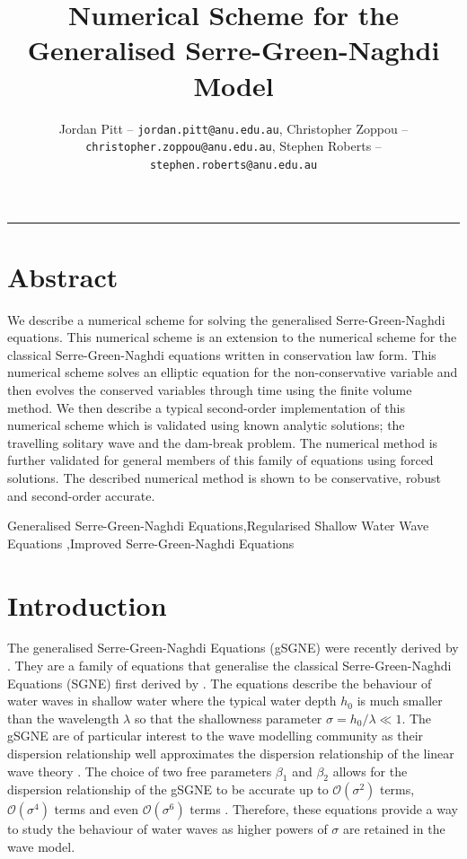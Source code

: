 \documentclass[10pt]{elsarticle}
\title{Numerical Scheme for the Generalised Serre-Green-Naghdi Model}
\author{Jordan Pitt -- \texttt{jordan.pitt@anu.edu.au}, Christopher Zoppou -- \texttt{christopher.zoppou@anu.edu.au}, Stephen Roberts -- \texttt{stephen.roberts@anu.edu.au}}
\begin{document}
\maketitle

\vspace{-0.3in}
\noindent
\rule{\linewidth}{0.4pt}



\section{Abstract}
We describe a numerical scheme for solving the generalised Serre-Green-Naghdi equations. This numerical scheme is an extension to the numerical scheme for the classical Serre-Green-Naghdi equations written in conservation law form. This numerical scheme solves an elliptic equation for the non-conservative variable and then evolves the conserved variables through time using the finite volume method. We then describe a typical second-order implementation of this numerical scheme which is validated using known analytic solutions; the travelling solitary wave and the dam-break problem. The numerical method is further validated for general members of this family of equations using forced solutions. The described numerical method is shown to be conservative, robust and second-order accurate.

\begin{keyword}
	Generalised Serre-Green-Naghdi Equations\sep Regularised Shallow Water Wave Equations \sep Improved Serre-Green-Naghdi Equations
\end{keyword}

\section{Introduction}
The generalised Serre-Green-Naghdi Equations (gSGNE) were recently derived by \citet{Clamond-Dutykh-2018-237}. They are a family of equations that generalise the classical Serre-Green-Naghdi Equations (SGNE) first derived by \citet{Serre-F-1953-857}. The equations describe the behaviour of water waves in shallow water where the typical water depth $h_0$ is much smaller than the wavelength $\lambda$ so that the shallowness parameter $\sigma = h_0/\lambda \ll 1$. The gSGNE are of particular interest to the wave modelling community as their dispersion relationship well approximates the dispersion relationship of the linear wave theory \cite{Whitham-1967-399}. The choice of two free parameters $\beta_1$ and $\beta_2$ allows for the dispersion relationship of the gSGNE to be accurate up to $\mathcal{O}\left(\sigma^2\right)$ terms, $\mathcal{O}\left(\sigma^4\right)$ terms and even $\mathcal{O}\left(\sigma^6\right)$ terms \cite{Clamond-Dutykh-2018-237,Clamond-et.al-2017-245}. Therefore, these equations provide a way to study the behaviour of water waves as higher powers of $\sigma$ are retained in the wave model. 
\end{document}
